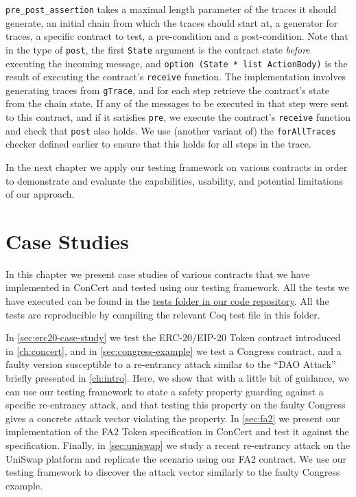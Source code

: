 \documentclass[twoside,11pt,openright]{report}
\newcommand{\coq}[1]{\texttt{#1}}
\begin{document}
\coq{pre\_post\_assertion} takes a maximal length parameter of the traces it should generate, an initial chain from which the traces should start at, a generator for traces, a specific contract to test, a pre-condition and a post-condition. Note that in the type of \coq{post}, the first \coq{State} argument is the contract state \textit{before} executing the incoming message, and \coq{option (State * list ActionBody)} is the result of executing the contract's \coq{receive} function. The implementation involves generating traces from \coq{gTrace}, and for each step retrieve the contract's state from the chain state. If any of the messages to be executed in that step were sent to this contract, and if it satisfies \coq{pre}, we execute the contract's \coq{receive} function and check that \coq{post} also holds. We use (another variant of) the \coq{forAllTraces} checker defined earlier to ensure that this holds for all steps in the trace.

In the next chapter we apply our testing framework on various contracts in order to demonstrate and evaluate the capabilities, usability, and potential limitations of our approach. 

\chapter{Case Studies}
\label{ch:case-studies}
In this chapter we present case studies of various contracts that we have implemented in ConCert and tested using our testing framework. All the tests we have executed can be found in the \href{https://github.com/mikkelmilo/ConCert/tree/master/execution/tests}{tests folder in our code repository}. All the tests are reproducible by compiling the relevant Coq test file in this folder.

In \autoref{sec:erc20-case-study} we test the ERC-20/EIP-20 Token contract introduced in \autoref{ch:concert}, and in \autoref{sec:congress-example} we test a Congress contract, and a faulty version susceptible to a re-entrancy attack similar to the ``DAO Attack'' briefly presented in \autoref{ch:intro}. Here, we show that with a little bit of guidance, we can use our testing framework to state a safety property guarding against a specific re-entrancy attack, and that testing this property on the faulty Congress gives a concrete attack vector violating the property. In \autoref{sec:fa2} we present our implementation of the FA2 Token specification in ConCert and test it against the specification. Finally, in \autoref{sec:uniswap} we study a recent re-entrancy attack on the UniSwap platform and replicate the scenario using our FA2 contract. We use our testing framework to discover the attack vector similarly to the faulty Congress example. 
\end{document}

